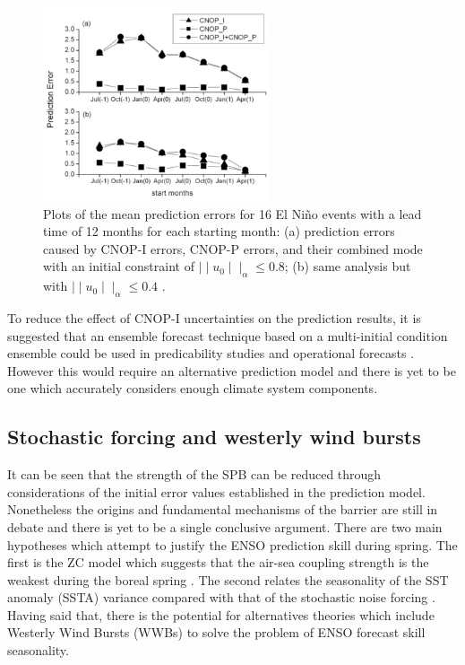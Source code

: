 \documentclass[12pt, onecolumn]{revtex4}    %
\begin{document}
\begin{figure}
\includegraphics[width=0.6\textwidth]{data/cnop}
\caption[CNOP]{Plots of the mean prediction errors for 16 El Ni\~{n}o events with a lead time of 12 months for each starting month: (a) prediction errors caused by CNOP-I errors, CNOP-P errors, and their combined mode with an initial constraint of $\mid \mid u_0 \mid \mid _\alpha \leq 0.8$; (b) same analysis but with $\mid \mid u_0 \mid \mid _\alpha \leq 0.4$ \citep{yu2012does}.}
\label{fig:cnop}
\end{figure}

To reduce the effect of CNOP-I uncertainties on the prediction results, it is suggested that an ensemble forecast technique based on a multi-initial condition ensemble could be used in predicability studies and operational forecasts \citep{kirtman2001current}. However this would require an alternative prediction model and there is yet to be one which accurately considers enough climate system components. 

\subsection{Stochastic forcing and westerly wind bursts}

It can be seen that the strength of the SPB can be reduced through considerations of the initial error values established in the prediction model. Nonetheless the origins and fundamental mechanisms of the barrier are still in debate and there is yet to be a single conclusive argument. There are two main hypotheses which attempt to justify the ENSO prediction skill during spring. The first is the ZC model which suggests that the air-sea coupling strength is the weakest during the boreal spring \citep{Zebiak:1987aa}. The second relates the seasonality of the SST anomaly (SSTA) variance compared with that of the stochastic noise forcing \citep{webster1992monsoon, xue1994prediction}. Having said that, there is the potential for alternatives theories which include Westerly Wind Bursts (WWBs) to solve the problem of ENSO forecast skill seasonality. \\
\end{document}
